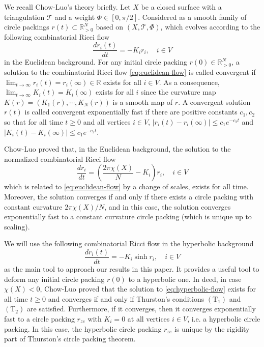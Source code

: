 \documentclass[12pt]{amsart}
\numberwithin{equation}{section}
\newcommand{\R}{\mathbb{R}}
\begin{document}
We recall Chow-Luo's theory briefly. Let $X$ be a closed surface with a triangulation $\mathcal{T}$ and a weight
$\Phi \in [0,\pi/2]$. Considered as a smooth family of circle packings $r(t) \subset \mathbb{R}^N_{>0}$ based on $(X,\mathcal{T},\Phi)$, which evolves
according to the following combinatorial Ricci flow
\begin{equation}\label{eq:euclidean-flow}
\frac{dr_i(t)}{dt} = -K_i r_i, \quad i \in V
\end{equation}
in the Euclidean background. For any initial circle packing $r(0) \in \mathbb{R}^N_{>0}$, a solution to the combinatorial
Ricci flow \eqref{eq:euclidean-flow} is called convergent if $\lim_{t \to \infty} r_i(t) = r_i(\infty) \in \R$ exists for all $i \in V$. As a consequence,
$\lim_{t \to \infty} K_i(t) = K_i(\infty)$ exists for all $i$ since the curvature map $K(r) = (K_1(r), \cdots, K_N(r))$ is a smooth map
of $r$. A convergent solution $r(t)$ is called convergent exponentially fast if there are positive constants $c_1, c_2$
so that for all time $t \geq 0$ and all vertices $i \in V$, $|r_i(t) - r_i(\infty)| \leq c_1 e^{-c_2 t}$ and $|K_i(t) - K_i(\infty)| \leq c_1 e^{-c_2 t}$.

Chow-Luo proved that, in the Euclidean background, the solution to the normalized combinatorial Ricci
flow
\begin{equation}\label{eq:normalized-flow}
\frac{dr_i}{dt} = \left(\frac{2\pi\chi(X)}{N} - K_i\right) r_i, \quad i \in V
\end{equation}
which is related to \eqref{eq:euclidean-flow} by a change of scales, exists for all time. Moreover, the solution converges if and
only if there exists a circle packing with constant curvature $2\pi\chi(X)/N$, and in this case, the solution
converges exponentially fast to a constant curvature circle packing (which is unique up to scaling).

We will use the following combinatorial Ricci flow in the hyperbolic background
\begin{equation}\label{eq:hyperbolic-flow}
\frac{dr_i(t)}{dt} = -K_i \sinh r_i, \quad i \in V
\end{equation}
as the main tool to approach our results in this paper. It provides a useful tool to deform any initial
circle packing $r(0)$ to a hyperbolic one. In deed, in case $\chi(X) < 0$, Chow-Luo proved that the solution
to \eqref{eq:hyperbolic-flow} exists for all time $t \geq 0$ and converges if and only if Thurston's conditions $(\mathrm{T}_1)$ and $(\mathrm{T}_2)$ are
satisfied. Furthermore, if it converges, then it converges exponentially fast to a circle packing $r_{ze}$ with
$K_i = 0$ at all vertices $i \in V$, i.e. a hyperbolic circle packing. In this case, the hyperbolic circle packing
$r_{ze}$ is unique by the rigidity part of Thurston's circle packing theorem.
\end{document}
